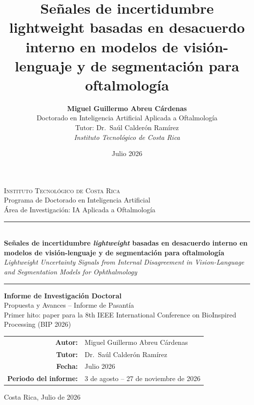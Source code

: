 \documentclass[12pt,a4paper]{article}
\title{\textbf{Señales de incertidumbre lightweight basadas en desacuerdo interno en modelos de visión-lenguaje y de segmentación para oftalmología}}
\author{
    \textbf{Miguel Guillermo Abreu Cárdenas}\\[0.3em]
    Doctorado en Inteligencia Artificial Aplicada a Oftalmología\\
    Tutor: Dr.~Saúl Calderón Ramírez\\[0.5em]
    \textit{Instituto Tecnológico de Costa Rica}
}
\date{Julio 2026}
\begin{document}
\begin{titlepage}
    \centering
    \vspace*{1cm}

    {\Large\textsc{Instituto Tecnológico de Costa Rica}}\\[0.3cm]
    {\large Programa de Doctorado en Inteligencia Artificial}\\[0.3cm]
    {\large Área de Investigación: IA Aplicada a Oftalmología}

    \vspace{1.5cm}

    \rule{\linewidth}{0.5mm}\\[0.6cm]
    {\LARGE\bfseries Señales de incertidumbre \textit{lightweight} basadas en desacuerdo interno en modelos de visión-lenguaje y de segmentación para oftalmología}\\[0.4cm]
    {\large\itshape Lightweight Uncertainty Signals from Internal Disagreement in Vision-Language and Segmentation Models for Ophthalmology}\\[0.3cm]
    \rule{\linewidth}{0.5mm}

    \vspace{1.2cm}

    {\Large\textbf{Informe de Investigación Doctoral}}\\[0.4cm]
    {\large Propuesta y Avances -- Informe de Pasantía}\\[0.4cm]
    {\small Primer hito: paper para la 8th IEEE International Conference on BioInspired Processing (BIP 2026)}

    \vspace{1.5cm}

    \begin{tabular}{rl}
        \textbf{Autor:} & Miguel Guillermo Abreu Cárdenas \\[0.3em]
        \textbf{Tutor:} & Dr.~Saúl Calderón Ramírez \\[0.3em]
        \textbf{Fecha:} & Julio 2026 \\[0.3em]
        \textbf{Periodo del informe:} & 3 de agosto -- 27 de noviembre de 2026 \\
    \end{tabular}

    \vfill

    {\small Costa Rica, Julio de 2026}
\end{titlepage}

\newpage
\tableofcontents
\newpage
\end{document}
